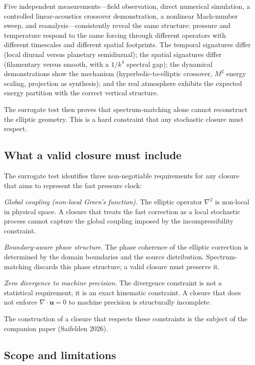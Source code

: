 \documentclass[aps,prfluids,preprint,superscriptaddress,nofootinbib]{revtex4-2}
\begin{document}
Five independent measurements---field observation, direct numerical simulation, a controlled linear-acoustics crossover demonstration, a nonlinear Mach-number sweep, and reanalysis---consistently reveal the same structure: pressure and temperature respond to the same forcing through different operators with different timescales and different spatial footprints. The temporal signatures differ (local diurnal versus planetary semidiurnal); the spatial signatures differ (filamentary versus smooth, with a $1/k^4$ spectral gap); the dynamical demonstrations show the mechanism (hyperbolic-to-elliptic crossover, $M^2$ energy scaling, projection as synthesis); and the real atmosphere exhibits the expected energy partition with the correct vertical structure.

The surrogate test then proves that spectrum-matching alone cannot reconstruct the elliptic geometry. This is a hard constraint that any stochastic closure must respect.

\subsection{What a valid closure must include}

The surrogate test identifies three non-negotiable requirements for any closure that aims to represent the fast pressure clock:

\emph{Global coupling (non-local Green's function).} The elliptic operator $\nabla^2$ is non-local in physical space. A closure that treats the fast correction as a local stochastic process cannot capture the global coupling imposed by the incompressibility constraint.

\emph{Boundary-aware phase structure.} The phase coherence of the elliptic correction is determined by the domain boundaries and the source distribution. Spectrum-matching discards this phase structure; a valid closure must preserve it.

\emph{Zero divergence to machine precision.} The divergence constraint is not a statistical requirement; it is an exact kinematic constraint. A closure that does not enforce $\nabla\cdot\mathbf{u} = 0$ to machine precision is structurally incomplete.

The construction of a closure that respects these constraints is the subject of the companion paper (Saifelden 2026).

\subsection{Scope and limitations}
\label{sec:scope}
\end{document}
